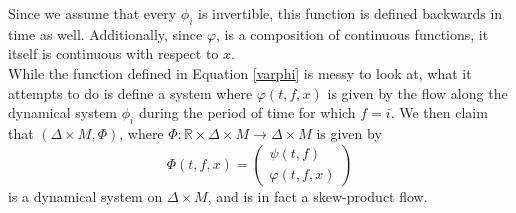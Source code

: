 \documentclass[11pt]{article}
\begin{document}
Since we assume that every $\phi_i$ is invertible, this function is defined backwards in time as well. Additionally, since $\varphi$, is a composition of continuous functions, it itself is continuous with respect to $x$. \\
\indent While the function defined in Equation \ref{varphi} is messy to look at, what it attempts to do is define a system where $\varphi(t,f,x)$ is given by the flow along the dynamical system $\phi_i$ during the period of time for which $f = i$.  We then claim that $(\Delta\times M, \Phi)$, where $\Phi:\mathbb{R}\times\Delta\times M\rightarrow \Delta\times M$ is given by
\begin{equation*}\label{dynsys}
\Phi(t,f,x) = \left (
\begin{array}{cc}
\psi(t,f)\\
\varphi(t,f,x)
\end{array} \right ) 
\end{equation*}
is a dynamical system on $\Delta\times M$, and is in fact a skew-product flow.

\end{document}
